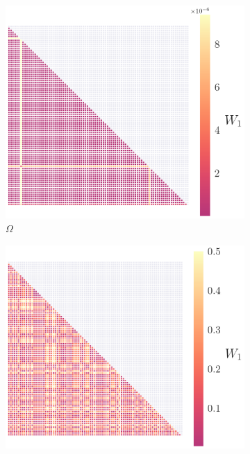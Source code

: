 \documentclass[fleqn,usenatbib,useAMS]{mnras}
\begin{document}
\begin{figure}
	
	\begin{subfigure}[b]{0.22\textwidth}
		\includegraphics[width=\textwidth]{images/WD_0}
		\caption{$\Omega$}
	\end{subfigure}
	\hfill
	\begin{subfigure}[b]{0.22\textwidth}
		\includegraphics[width=\textwidth]{images/WD_1}

\end{subfigure}
\end{figure}
\end{document}

